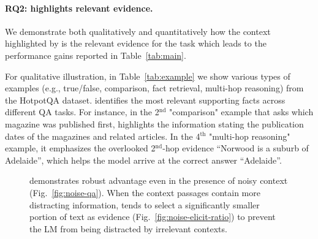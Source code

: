 \paragraph{RQ2: \se highlights relevant evidence.}
We demonstrate both qualitatively and quantitatively how the context highlighted by \se is the relevant evidence for the task which leads to the performance gains reported in Table~\ref{tab:main}.

For qualitative illustration, in Table~\ref{tab:example} we show various types of examples (e.g., true/false, comparison, fact retrieval, multi-hop reasoning) from the HotpotQA dataset. \se identifies the most relevant supporting facts across different QA tasks. For instance, in the 2$^\text{nd}$ "comparison" example that asks which magazine was published first, \se highlights the information stating the publication dates of the magazines and related articles. In the 4$^\text{th}$ "multi-hop reasoning" example, it emphasizes the overlooked 2$^\text{nd}$-hop evidence “Norwood is a suburb of Adelaide”, which helps the model arrive at the correct answer “Adelaide”.

\begin{figure*}[t]
\hfill
  \vspace*{-5pt}
  \caption{
    \se demonstrates robust advantage even in the presence of noisy context (Fig.~\ref{fig:noise-qa}).
    When the context passages contain more distracting information, \se tends to select a significantly smaller portion of text as evidence (Fig.~\ref{fig:noise-elicit-ratio}) to prevent the LM from being distracted by irrelevant contexts.
  }
  \label{fig:noise}
\end{figure*}


